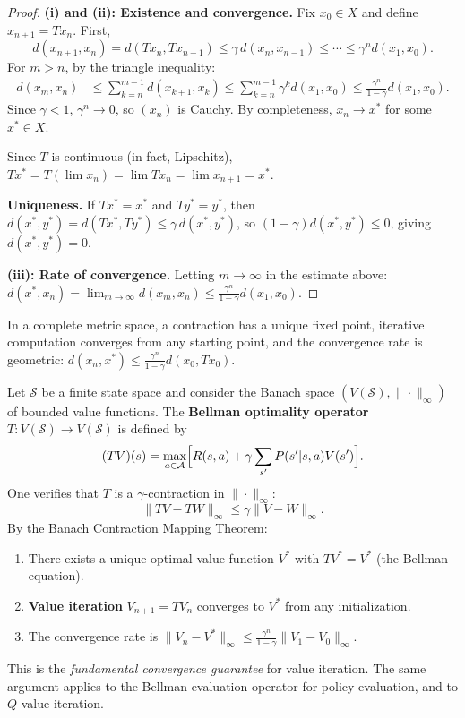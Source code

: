 \documentclass[11pt,a4paper]{article}
\theoremstyle{definition}
\theoremstyle{plain}
\theoremstyle{remark}
\begin{document}
\begin{proof}
\textbf{(i) and (ii): Existence and convergence.}
Fix $x_0 \in X$ and define $x_{n+1} = Tx_n$. First,
\[
    d(x_{n+1}, x_n) = d(Tx_n, Tx_{n-1}) \leq \gamma \, d(x_n, x_{n-1})
    \leq \cdots \leq \gamma^n d(x_1, x_0).
\]
For $m > n$, by the triangle inequality:
\begin{align*}
    d(x_m, x_n) &\leq \sum_{k=n}^{m-1} d(x_{k+1}, x_k)
    \leq \sum_{k=n}^{m-1} \gamma^k d(x_1, x_0)
    \leq \frac{\gamma^n}{1 - \gamma} d(x_1, x_0).
\end{align*}
Since $\gamma < 1$, $\gamma^n \to 0$, so $(x_n)$ is Cauchy. By completeness,
$x_n \to x^*$ for some $x^* \in X$.

Since $T$ is continuous (in fact, Lipschitz), $Tx^* = T(\lim x_n) = \lim Tx_n
= \lim x_{n+1} = x^*$.

\textbf{Uniqueness.} If $Tx^* = x^*$ and $Ty^* = y^*$, then
$d(x^*, y^*) = d(Tx^*, Ty^*) \leq \gamma \, d(x^*, y^*)$, so
$(1 - \gamma) d(x^*, y^*) \leq 0$, giving $d(x^*, y^*) = 0$.

\textbf{(iii): Rate of convergence.}
Letting $m \to \infty$ in the estimate above:
$d(x^*, x_n) = \lim_{m \to \infty} d(x_m, x_n)
\leq \frac{\gamma^n}{1 - \gamma} d(x_1, x_0)$.
\end{proof}

\begin{keyresult}
In a complete metric space, a contraction has a unique fixed point, iterative
computation converges from any starting point, and the convergence rate is
geometric: $d(x_n, x^*) \leq \frac{\gamma^n}{1 - \gamma} d(x_0, Tx_0)$.
\end{keyresult}

\begin{rlconnection}
Let $\mathcal{S}$ be a finite state space and consider the Banach space
$(V(\mathcal{S}), \|\cdot\|_\infty)$ of bounded value functions. The
\textbf{Bellman optimality operator} $T \colon V(\mathcal{S}) \to V(\mathcal{S})$
is defined by
\[
    (TV)(s) = \max_{a \in \mathcal{A}} \Bigl[R(s,a) + \gamma \sum_{s'} P(s'|s,a) V(s')\Bigr].
\]
One verifies that $T$ is a $\gamma$-contraction in $\|\cdot\|_\infty$:
\[
    \|TV - TW\|_\infty \leq \gamma \|V - W\|_\infty.
\]
By the Banach Contraction Mapping Theorem:
\begin{enumerate}[leftmargin=2em]
    \item There exists a unique optimal value function $V^*$ with $TV^* = V^*$
          (the Bellman equation).
    \item \textbf{Value iteration} $V_{n+1} = TV_n$ converges to $V^*$ from
          any initialization.
    \item The convergence rate is
          $\|V_n - V^*\|_\infty \leq \frac{\gamma^n}{1 - \gamma} \|V_1 - V_0\|_\infty$.
\end{enumerate}
This is the \emph{fundamental convergence guarantee} for value iteration.
The same argument applies to the Bellman evaluation operator for policy
evaluation, and to $Q$-value iteration.
\end{rlconnection}
\end{document}
